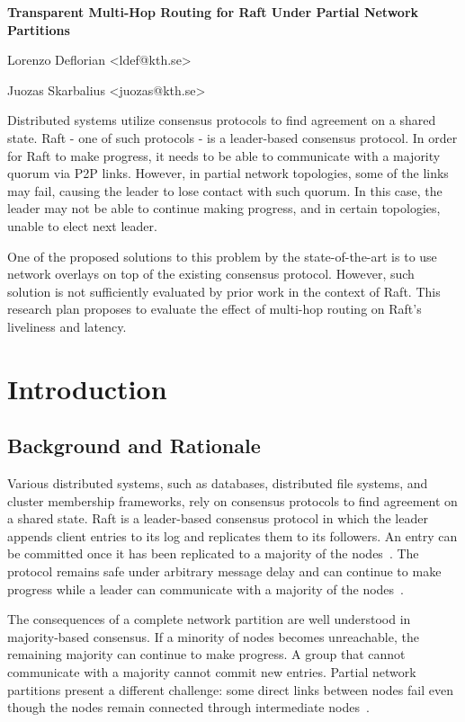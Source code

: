 \documentclass[11pt,a4paper]{article}
\newcommand{\unnumberedheading}[1]{%
  \par\vspace{2pt}{\fontsize{14}{16.5}\selectfont\bfseries #1\par}\vspace{6pt}%
}
\newcommand{\reporttitle}[1]{%
  {\fontsize{16}{19}\selectfont\bfseries #1\par}\vspace{12pt}%
}
\begin{document}
\reporttitle{Transparent Multi-Hop Routing for Raft Under Partial Network Partitions}
\unnumberedheading{Authors}
Lorenzo Deflorian <ldef@kth.se>\par
Juozas Skarbalius <juozas@kth.se>\par
\vspace{2pt}

\unnumberedheading{Abstract}
Distributed systems utilize consensus protocols to find agreement on a shared state. 
Raft - one of such protocols - is a leader-based consensus protocol.
In order for Raft to make progress, it needs to be able to communicate with a majority quorum via P2P links. 
However, in partial network topologies, some of the links may fail, causing the leader to lose contact with such quorum.
In this case, the leader may not be able to continue making progress, and in certain topologies, unable to elect next leader.

One of the proposed solutions to this problem by the state-of-the-art is to use network overlays on top of the existing consensus protocol.
However, such solution is not sufficiently evaluated by prior work in the context of Raft.
This research plan proposes to evaluate the effect of multi-hop routing on Raft's liveliness and latency.

\section{Introduction}

\subsection{Background and Rationale}

Various distributed systems, such as databases, distributed file systems, and cluster membership frameworks, rely on consensus protocols to find agreement on a shared state. 
Raft is a leader-based consensus protocol in which the leader appends client entries to its log and replicates them to its followers. 
An entry can be committed once it has been replicated to a majority of the nodes~\cite[Sec.~5.3]{ongaro2014raft}. 
The protocol remains safe under arbitrary message delay and can continue to make progress while a leader can communicate with a majority of the nodes~\cite[Secs.~5.3--5.4]{ongaro2014raft}.

The consequences of a complete network partition are well understood in majority-based consensus. 
If a minority of nodes becomes unreachable, the remaining majority can continue to make progress. 
A group that cannot communicate with a majority cannot commit new entries. 
Partial network partitions present a different challenge: some direct links between nodes fail even though the nodes remain connected through intermediate nodes~\cite[Sec.~2]{alfatafta2020nifty}.
\end{document}
